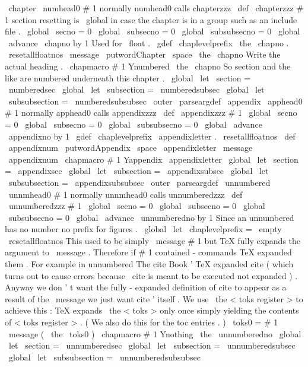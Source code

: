 {{\
chapter
{
\
numhead0
{
#
1
}
}
%
normally
numhead0
calls
chapterzzz
\
def
\
chapterzzz
#
1
{
%
%
section
resetting
is
\
global
in
case
the
chapter
is
in
a
group
such
%
as
an
include
file
.
\
global
\
secno
=
0
\
global
\
subsecno
=
0
\
global
\
subsubsecno
=
0
\
global
\
advance
\
chapno
by
1
%
%
Used
for
\
float
.
\
gdef
\
chaplevelprefix
{
\
the
\
chapno
.
}
%
\
resetallfloatnos
%
\
message
{
\
putwordChapter
\
space
\
the
\
chapno
}
%
%
%
Write
the
actual
heading
.
\
chapmacro
{
#
1
}
{
Ynumbered
}
{
\
the
\
chapno
}
%
%
%
So
section
and
the
like
are
numbered
underneath
this
chapter
.
\
global
\
let
\
section
=
\
numberedsec
\
global
\
let
\
subsection
=
\
numberedsubsec
\
global
\
let
\
subsubsection
=
\
numberedsubsubsec
}
\
outer
\
parseargdef
\
appendix
{
\
apphead0
{
#
1
}
}
%
normally
apphead0
calls
appendixzzz
\
def
\
appendixzzz
#
1
{
%
\
global
\
secno
=
0
\
global
\
subsecno
=
0
\
global
\
subsubsecno
=
0
\
global
\
advance
\
appendixno
by
1
\
gdef
\
chaplevelprefix
{
\
appendixletter
.
}
%
\
resetallfloatnos
%
\
def
\
appendixnum
{
\
putwordAppendix
\
space
\
appendixletter
}
%
\
message
{
\
appendixnum
}
%
%
\
chapmacro
{
#
1
}
{
Yappendix
}
{
\
appendixletter
}
%
%
\
global
\
let
\
section
=
\
appendixsec
\
global
\
let
\
subsection
=
\
appendixsubsec
\
global
\
let
\
subsubsection
=
\
appendixsubsubsec
}
\
outer
\
parseargdef
\
unnumbered
{
\
unnmhead0
{
#
1
}
}
%
normally
unnmhead0
calls
unnumberedzzz
\
def
\
unnumberedzzz
#
1
{
%
\
global
\
secno
=
0
\
global
\
subsecno
=
0
\
global
\
subsubsecno
=
0
\
global
\
advance
\
unnumberedno
by
1
%
%
Since
an
unnumbered
has
no
number
no
prefix
for
figures
.
\
global
\
let
\
chaplevelprefix
=
\
empty
\
resetallfloatnos
%
%
This
used
to
be
simply
\
message
{
#
1
}
but
TeX
fully
expands
the
%
argument
to
\
message
.
Therefore
if
#
1
contained
-
commands
TeX
%
expanded
them
.
For
example
in
unnumbered
The
cite
{
Book
}
'
TeX
%
expanded
cite
(
which
turns
out
to
cause
errors
because
\
cite
is
meant
%
to
be
executed
not
expanded
)
.
%
%
Anyway
we
don
'
t
want
the
fully
-
expanded
definition
of
cite
to
appear
%
as
a
result
of
the
\
message
we
just
want
cite
'
itself
.
We
use
%
\
the
<
toks
register
>
to
achieve
this
:
TeX
expands
\
the
<
toks
>
only
once
%
simply
yielding
the
contents
of
<
toks
register
>
.
(
We
also
do
this
for
%
the
toc
entries
.
)
\
toks0
=
{
#
1
}
%
\
message
{
(
\
the
\
toks0
)
}
%
%
\
chapmacro
{
#
1
}
{
Ynothing
}
{
\
the
\
unnumberedno
}
%
%
\
global
\
let
\
section
=
\
unnumberedsec
\
global
\
let
\
subsection
=
\
unnumberedsubsec
\
global
\
let
\
subsubsection
=
\
unnumberedsubsubsec
}}}
